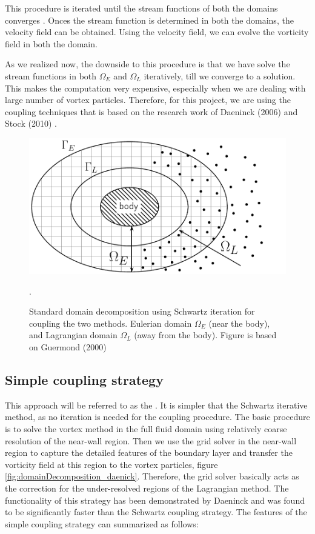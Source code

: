 This procedure is iterated until the stream functions of both the domains converges \cite{Ould-Salihi2001}. Onces the stream function is determined in both the domains, the velocity field can be obtained. Using the velocity field, we can evolve the vorticity field in both the domain. 

As we realized now, the downside to this procedure is that we have solve the stream functions in both $\Omega_E$ and $\Omega_L$ iteratively, till we converge to a solution. This makes the computation very expensive, especially when we are dealing with large number of vortex particles. Therefore, for this project, we are using the coupling techniques that is based on the research work of Daeninck (2006) \cite{Daeninck2006} and Stock (2010) \cite{Stock}.

	\begin{figure}[!t]
		\centering
		\includegraphics[width=0.6\linewidth]{figures/introduction/domainDecomposition_typical_type2.pdf}
		\caption{Standard domain decomposition using Schwartz iteration for coupling the two methods. Eulerian domain $\Omega_E$ (near the body), and Lagrangian domain $\Omega_L$ (away from the body). Figure is based on Guermond (2000) \cite{Guermond2000}}.
		\label{fig:domainDecomposition}
	\end{figure}

\subsection{Simple coupling strategy}
This approach will be referred to as the . It is simpler that the Schwartz iterative method, as no iteration is needed for the coupling procedure. The basic procedure is to solve the vortex method in the full fluid domain using relatively coarse resolution of the near-wall region. Then we use the grid solver in the near-wall region to capture the detailed features of the boundary layer and transfer the vorticity field at this region to the vortex particles, figure \ref{fig:domainDecomposition_daenick}. Therefore, the grid solver basically acts as the correction for the under-resolved regions of the Lagrangian method. The functionality of this strategy has been demonstrated by Daeninck and was found to be significantly faster than the Schwartz coupling strategy. The features of the simple coupling strategy can summarized as follows:


